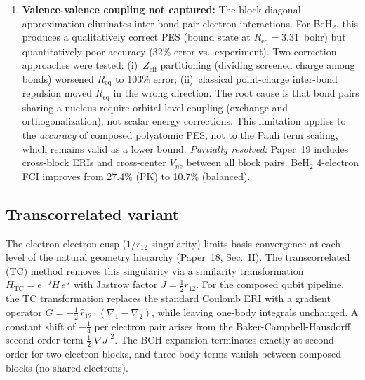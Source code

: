 \documentclass[aps,pra,twocolumn,superscriptaddress,longbibliography]{revtex4-2}
\begin{document}
\begin{enumerate}
  (5.3\% for LiH, 11.7\% for BeH$_2$, 19.4\% for H$_2$O;\ Paper~17) reflect
  the equilibrium distance of the composed PES, not the energy
  accuracy at any particular geometry.  For quantum simulation at
  a fixed nuclear configuration---the standard use case in
  fault-tolerant resource estimation~\cite{lee2021,reiher2017}---the
  relevant comparison is simulation cost at the same geometry and
  qubit count.
\item \textbf{Valence-valence coupling not captured:} The
  block-diagonal approximation eliminates inter-bond-pair electron
  interactions.  For BeH$_2$, this produces a qualitatively correct PES
  (bound state at $R_{\mathrm{eq}} = 3.31$~bohr) but quantitatively
  poor accuracy (32\% error vs.\ experiment).  Two correction approaches
  were tested: (i)~$Z_{\mathrm{eff}}$ partitioning (dividing screened
  charge among bonds) worsened $R_{\mathrm{eq}}$ to 103\% error;
  (ii)~classical point-charge inter-bond repulsion moved
  $R_{\mathrm{eq}}$ in the wrong direction.  The root cause is that bond
  pairs sharing a nucleus require orbital-level coupling (exchange and
  orthogonalization), not scalar energy corrections.  This limitation
  applies to the \emph{accuracy} of composed polyatomic PES, not to the
  Pauli term scaling, which remains valid as a lower bound.
  \textit{Partially resolved:} Paper~19 includes cross-block ERIs
  and cross-center $V_{ne}$ between all block pairs.  BeH$_2$
  4-electron FCI improves from 27.4\% (PK) to 10.7\% (balanced).
\end{enumerate}


\subsection{Transcorrelated variant}
\label{sec:tc_composed}

The electron-electron cusp ($1/r_{12}$ singularity) limits basis
convergence at each level of the natural geometry hierarchy
(Paper~18, Sec.~II).  The transcorrelated (TC) method removes
this singularity via a similarity transformation
$H_{\mathrm{TC}} = e^{-J} H\, e^{J}$ with Jastrow factor
$J = \tfrac{1}{2} r_{12}$.  For the composed qubit pipeline,
the TC transformation replaces the standard Coulomb ERI with a
gradient operator $G = -\tfrac{1}{2}\,\hat{r}_{12} \cdot
(\nabla_1 - \nabla_2)$, while leaving one-body integrals unchanged.
A constant shift of $-\tfrac{1}{4}$ per electron pair arises from
the Baker-Campbell-Hausdorff second-order term
$\tfrac{1}{2}|\nabla J|^2$.  The BCH expansion terminates exactly
at second order for two-electron blocks, and three-body terms vanish
between composed blocks (no shared electrons).
\end{document}

